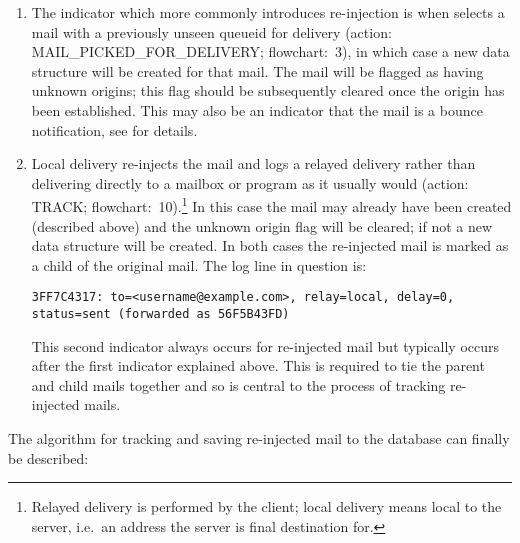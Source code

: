 \begin{enumerate}

    \item The indicator which more commonly introduces re-injection is when
         selects a mail with a previously unseen queueid for
        delivery (action: MAIL\_PICKED\_FOR\_DELIVERY\@; flowchart:~3), in
        which case a new data structure will be created for that mail.  The
        mail will be flagged as having unknown origins; this flag should be
        subsequently cleared once the origin has been established.  This
        may also be an indicator that the mail is a bounce notification,
        see  for details.

    \item Local delivery re-injects the mail and logs a relayed delivery
        rather than delivering directly to a mailbox or program as it
        usually would (action: TRACK\@; flowchart:~10).\footnote{Relayed
        delivery is performed by the \SMTP{} client; local delivery means
        local to the server, i.e.\ an address the server is final
        destination for.} In this case the mail may already have been
        created (described above) and the unknown origin flag will be
        cleared; if not a new data structure will be created.  In both
        cases the re-injected mail is marked as a child of the original
        mail.  The log line in question is:

        \texttt{3FF7C4317: to=<username@example.com>, relay=local, \newline
        delay=0, status=sent (forwarded as 56F5B43FD)}

        This second indicator always occurs for re-injected mail but
        typically occurs after the first indicator explained above.  This
        is required to tie the parent and child mails together and so is
        central to the process of tracking re-injected mails.

\end{enumerate}

The algorithm for tracking and saving re-injected mail to the database can
finally be described:

